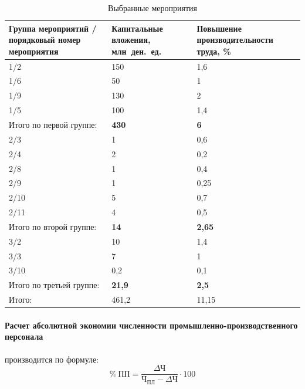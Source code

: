 \begin{table}[htbp]
  \caption{Выбранные мероприятия\label{tbl:solution}}
  \centering
    \begin{tabular}{| m{7.5cm} | m{3cm} | m{4.5cm} |}
      \hline
      Группа мероприятий / порядковый номер мероприятия &
      Капитальные \newline вложения, млн~ден.~ед. &
      Повышение \newline производительности труда, \% \\ \hline

      1/2 & 150 & 1{,}6 \\ \hline
      1/6 & 50 & 1 \\ \hline
      1/9 & 130 & 2 \\ \hline
      1/5 & 100 & 1{,}4 \\ \hline
      Итого по первой группе: & \textbf{430} & \textbf{6} \\ \hline

      2/3 & 1 & 0{,}6 \\ \hline
      2/4 & 2 & 0{,}2 \\ \hline
      2/8 & 1 & 0{,}4 \\ \hline
      2/9 & 1 & 0{,}25 \\ \hline
      2/10 & 5 & 0{,}7 \\ \hline
      2/11 & 4 & 0{,}5 \\ \hline
      Итого по второй группе: & \textbf{14} & \textbf{2{,}65} \\ \hline

      3/2 & 10 & 1{,}4 \\ \hline
      3/3 & 7 & 1 \\ \hline
      3/10 & 0{,}2 & 0{,}1 \\ \hline
      Итого по третьей группе: & \textbf{21{,}9} & \textbf{2{,}5} \\ \hline
      Итого: & 461{,}2 & 11{,}15 \\ \hline
    \end{tabular}
\end{table}

\paragraph{Расчет абсолютной экономии численности промышленно-производственного
 персонала} производится по формуле:
\begin{equation}
\% ~ \text{ПП} = \dfrac{\Delta\text{Ч}}{\text{Ч}_{\text{ПЛ}} - \Delta\text{Ч}} \cdot 100
\end{equation}

